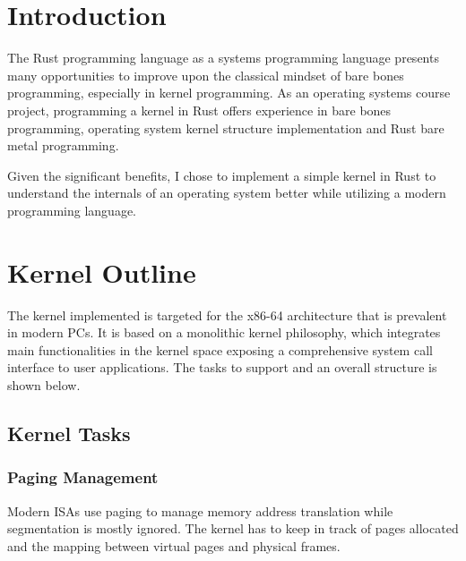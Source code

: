 \documentclass[conference]{IEEEtran}
\begin{document}




%
\IEEEpeerreviewmaketitle



\section{Introduction}

The Rust programming language as a systems programming language presents many opportunities to improve upon the classical mindset of bare bones programming, especially in kernel programming. As an operating systems course project, programming a kernel in Rust offers experience in bare bones programming, operating system kernel structure implementation and Rust bare metal programming.

Given the significant benefits, I chose to implement a simple kernel in Rust to understand the internals of an operating system better while utilizing a modern programming language.

\section{Kernel Outline}

The kernel implemented is targeted for the x86-64 architecture that is prevalent in modern PCs. It is based on a monolithic kernel philosophy, which integrates main functionalities in the kernel space exposing a comprehensive system call interface to user applications. The tasks to support and an overall structure is shown below.

\subsection{Kernel Tasks}

\subsubsection{Paging Management}

Modern ISAs use paging to manage memory address translation while segmentation is mostly ignored. The kernel has to keep in track of pages allocated and the mapping between virtual pages and physical frames.
\end{document}
